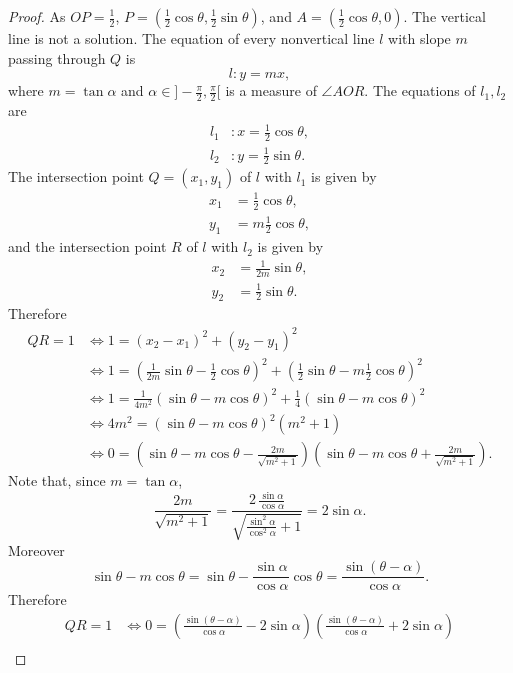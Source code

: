 \documentclass[11pt,a4paper]{article}
\begin{document}
\begin{proof}
As $OP = \frac{1}{2}$, $P = \left(\frac{1}{2} \cos \theta, \frac{1}{2} \sin \theta \right)$, and $A = \left(\frac{1}{2} \cos \theta,0 \right)$. The vertical line is not a solution. The equation of every nonvertical line  $l$ with slope $m$ passing through $Q$ is $$l : y = mx,$$ where $m = \tan \alpha$ and $\alpha\in ] -\frac{\pi}{2}, \frac{\pi}{2}[$ is a measure of $\angle AOR$.
The equations of $l_1,l_2$ are 
\begin{align*}
l_1  &: x = \frac{1}{2} \cos \theta,\\
l_2 &: y = \frac{1}{2} \sin \theta.
\end{align*}
The intersection point $Q = (x_1,y_1)$ of $l$ with $l_1$ is given by
\begin{align*}
x_1 &= \frac{1}{2} \cos \theta,\\
y_1 &= m \frac{1}{2} \cos \theta,
\end{align*}
and the intersection point $R$ of $l$ with $l_2$ is given by
\begin{align*}
x_2 &= \frac{1}{2m} \sin \theta,\\
y_2 & = \frac{1}{2} \sin \theta.
\end{align*}
Therefore
\begin{align*}
QR = 1 &\iff 1 = (x_2-x_1)^2 + (y_2-y_1)^2\\
&\iff 1 = \left ( \frac{1}{2m} \sin \theta -  \frac{1}{2} \cos \theta \right)^2 + \left( \frac{1}{2} \sin \theta - m \frac{1}{2} \cos \theta\right)^2\\
&\iff 1 = \frac{1}{4m^2} (\sin \theta - m \cos \theta)^2 + \frac{1}{4} (\sin \theta - m \cos \theta)^2\\
&\iff 4 m^2  = (\sin \theta - m \cos \theta)^2(m^2+1)\\
&\iff 0 = \left (\sin \theta - m \cos \theta - \frac{2m}{\sqrt{m^2+1}}\right )\left (\sin \theta - m \cos \theta + \frac{2m}{\sqrt{m^2+1}}\right).
\end{align*}
Note that, since $m = \tan \alpha$,
$$ \frac{2m}{\sqrt{m^2+1}} = \frac{2 \, \frac{\sin \alpha}{\cos \alpha}} {\sqrt{\frac{\sin^2 \alpha}{\cos^2 \alpha} + 1}}  = 2 \sin \alpha.$$
Moreover 
$$\sin \theta - m \cos \theta = \sin \theta - \frac{\sin \alpha}{\cos \alpha} \cos \theta = \frac{\sin(\theta - \alpha)}{\cos \alpha}.$$
Therefore
\begin{align*}
 QR = 1 &\iff 0 = \left (\frac{\sin(\theta - \alpha)}{\cos \alpha} - 2 \sin \alpha \right) \left (\frac{\sin(\theta - \alpha)}{\cos \alpha} + 2 \sin \alpha \right)\\

\end{align*}
\end{proof}
\end{document}
